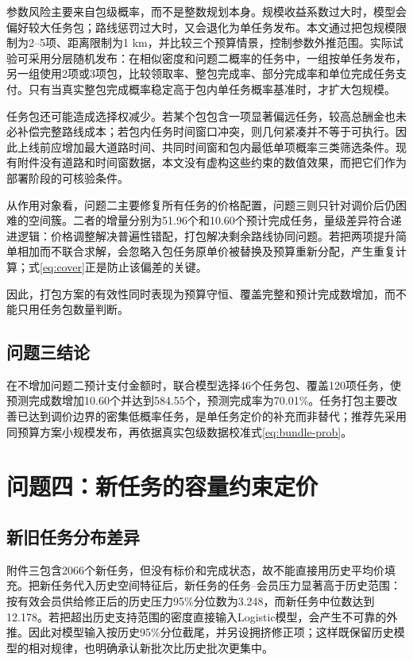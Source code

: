 ﻿\documentclass[UTF8,zihao=-4,a4paper,fontset=fandol]{ctexart}
\begin{document}
参数风险主要来自包级概率，而不是整数规划本身。规模收益系数过大时，模型会偏好较大任务包；路线惩罚过大时，又会退化为单任务发布。本文通过把包规模限制为2--5项、距离限制为1 km，并比较三个预算情景，控制参数外推范围。实际试验可采用分层随机发布：在相似密度和问题二概率的任务中，一组按单任务发布，另一组使用2项或3项包，比较领取率、整包完成率、部分完成率和单位完成任务支付。只有当真实整包完成概率稳定高于包内单任务概率基准时，才扩大包规模。

任务包还可能造成选择权减少。若某个包包含一项显著偏远任务，较高总酬金也未必补偿完整路线成本；若包内任务时间窗口冲突，则几何紧凑并不等于可执行。因此上线前应增加最大道路时间、共同时间窗和包内最低单项概率三类筛选条件。现有附件没有道路和时间窗数据，本文没有虚构这些约束的数值效果，而把它们作为部署阶段的可核验条件。

从作用对象看，问题二主要修复所有任务的价格配置，问题三则只针对调价后仍困难的空间簇。二者的增量分别为51.96个和10.60个预计完成任务，量级差异符合递进逻辑：价格调整解决普遍性错配，打包解决剩余路线协同问题。若把两项提升简单相加而不联合求解，会忽略入包任务原单价被替换及预算重新分配，产生重复计算；式\eqref{eq:cover}正是防止该偏差的关键。

因此，打包方案的有效性同时表现为预算守恒、覆盖完整和预计完成数增加，而不能只用任务包数量判断。

\subsection{问题三结论}

在不增加问题二预计支付金额时，联合模型选择46个任务包、覆盖120项任务，使预测完成数增加10.60个并达到584.55个，预测完成率为70.01\%。任务打包主要改善已达到调价边界的密集低概率任务，是单任务定价的补充而非替代；推荐先采用同预算方案小规模发布，再依据真实包级数据校准式\eqref{eq:bundle-prob}。

\section{问题四：新任务的容量约束定价}

\subsection{新旧任务分布差异}

附件三包含2066个新任务，但没有标价和完成状态，故不能直接用历史平均价填充。把新任务代入历史空间特征后，新任务的任务--会员压力显著高于历史范围：按有效会员供给修正后的历史压力95\%分位数为3.248，而新任务中位数达到12.178。若把超出历史支持范围的密度直接输入Logistic模型，会产生不可靠的外推。因此对模型输入按历史95\%分位截尾，并另设拥挤修正项；这样既保留历史模型的相对规律，也明确承认新批次比历史批次更集中。
\end{document}
